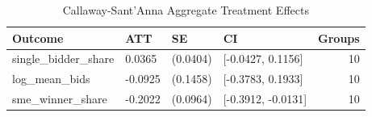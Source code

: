 \begin{table}[ht]
\centering
\begin{tabular}{llllr}
  \hline
Outcome & ATT & SE & CI & Groups \\ 
  \hline
single\_bidder\_share & 0.0365 & (0.0404) & [-0.0427, 0.1156] &  10 \\ 
  log\_mean\_bids & -0.0925 & (0.1458) & [-0.3783, 0.1933] &  10 \\ 
  sme\_winner\_share & -0.2022 & (0.0964) & [-0.3912, -0.0131] &  10 \\ 
   \hline
\end{tabular}
\caption{Callaway-Sant'Anna Aggregate Treatment Effects} 
\label{tab:cs_results}
\end{table}
